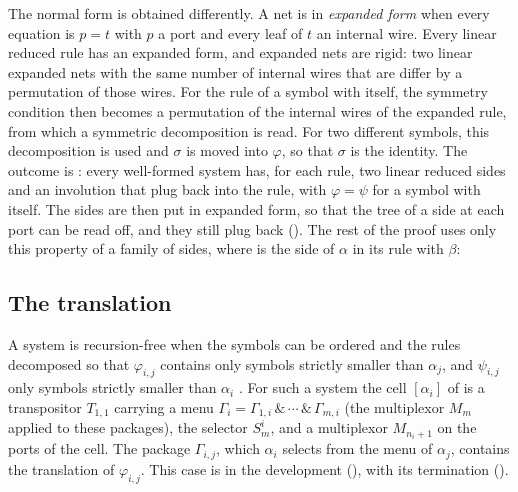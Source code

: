 \documentclass[11pt,a4paper]{article}
\newcommand{\lean}[1]{%
  \VerbatimInput[frame=single,rulecolor=\color{codeframe},framesep=1.6mm,breaklines=true,
    breakanywhere=false,breaksymbolleft={},samepage=true,fontsize=\fontsize{7.4}{9.0}\selectfont]{snip/#1.lean}}
\newcommand{\Equiv}{\cod{Equiv}}
\newcommand{\pp}[1]{\cite[#1]{lafont1997}}
\begin{document}
The normal form is obtained differently. A net is in \emph{expanded form} when every equation
is $p = t$ with $p$ a port and every leaf of $t$ an internal wire. Every linear reduced rule
has an expanded form, and expanded nets are rigid: two linear expanded nets with the same
number of internal wires that are \Equiv{} differ by a permutation of those wires. For the rule
of a symbol with itself, the symmetry condition then becomes a permutation of the internal
wires of the expanded rule, from which a symmetric decomposition is read. For two different
symbols, this decomposition is used and $\sigma$ is moved into $\varphi$, so that
$\sigma$ is the identity. The outcome is : every well-formed
system has, for each rule, two linear reduced sides and an involution that plug back into the
rule, with $\varphi = \psi$ for a symbol with itself. The sides are then put in expanded form,
so that the tree of a side at each port can be read off, and they still plug back
(). The rest of the proof uses only this property of a family
of sides, where  is the side of $\alpha$ in its rule with $\beta$:

\lean{sidesplug}

\subsection{The translation}
\label{sec:general}

A system is recursion-free when the symbols can be ordered and the rules decomposed so that
$\varphi_{i,j}$ contains only symbols strictly smaller than $\alpha_j$, and $\psi_{i,j}$ only
symbols strictly smaller than $\alpha_i$ \pp{p.~86}. For such a system the cell $[\alpha_i]$
of \pp{Fig.~6} is a transpositor $T_{1,1}$ carrying a menu $\Gamma_i = \Gamma_{1,i} \,\&\,
\cdots \,\&\, \Gamma_{m,i}$ (the multiplexor $M_m$ applied to these packages), the selector
$S^i_m$, and a multiplexor $M_{n_i+1}$ on the ports of the cell. The package $\Gamma_{i,j}$,
which $\alpha_i$ selects from the menu of $\alpha_j$, contains the translation of
$\varphi_{i,j}$. This case is in the
development (), with its termination
().
\end{document}
